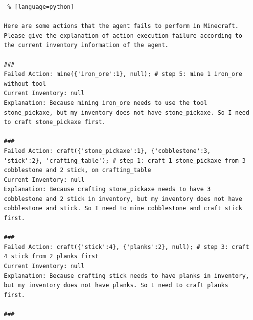 
\begin{lstlisting} % [language=python] 

Here are some actions that the agent fails to perform in Minecraft. Please give the explanation of action execution failure according to the current inventory information of the agent.

###
Failed Action: mine({'iron_ore':1}, null); # step 5: mine 1 iron_ore without tool
Current Inventory: null
Explanation: Because mining iron_ore needs to use the tool stone_pickaxe, but my inventory does not have stone_pickaxe. So I need to craft stone_pickaxe first.

###
Failed Action: craft({'stone_pickaxe':1}, {'cobblestone':3, 'stick':2}, 'crafting_table'); # step 1: craft 1 stone_pickaxe from 3 cobblestone and 2 stick, on crafting_table
Current Inventory: null
Explanation: Because crafting stone_pickaxe needs to have 3 cobblestone and 2 stick in inventory, but my inventory does not have cobblestone and stick. So I need to mine cobblestone and craft stick first.

### 
Failed Action: craft({'stick':4}, {'planks':2}, null); # step 3: craft 4 stick from 2 planks first
Current Inventory: null
Explanation: Because crafting stick needs to have planks in inventory, but my inventory does not have planks. So I need to craft planks first.

###


\end{lstlisting}

